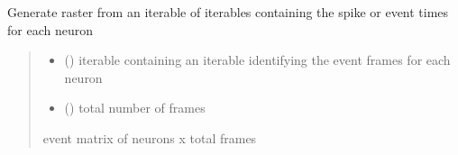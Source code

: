 \documentclass[letterpaper,10pt,english]{sphinxmanual}
\begin{document}
\begin{fulllineitems}
\label{\detokenize{CalSciPy.reorganization:CalSciPy.reorganization.generate_raster}}
\pysigstartsignatures
{}
\pysigstopsignatures
\sphinxAtStartPar
Generate raster from an iterable of iterables containing the spike or event times for each neuron
\begin{quote}\begin{description}
\begin{itemize}
\item {} 
\sphinxAtStartPar
{} (\sphinxstyleliteralemphasis{\sphinxupquote{{[}}}\sphinxstyleliteralemphasis{\sphinxupquote{{[}}}\sphinxstyleliteralemphasis{\sphinxupquote{{]}}}\sphinxstyleliteralemphasis{\sphinxupquote{{]}}}) \textendash{} iterable containing an iterable identifying the event frames for each neuron

\item {} 
\sphinxAtStartPar
{} (\sphinxstyleliteralemphasis{\sphinxupquote{{[}}}\sphinxstyleliteralemphasis{\sphinxupquote{{]} }}) \textendash{} total number of frames

\end{itemize}

\sphinxAtStartPar
event matrix of neurons x total frames

\sphinxAtStartPar
{}

\end{description}\end{quote}

\end{fulllineitems}
\end{document}
